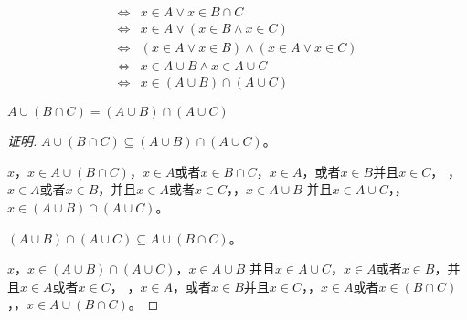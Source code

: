 \documentclass{beamer}
\begin{document}
\begin{CJK*}{UTF8}{gbsn}
\begin{frame}
\begin{equation*}
\begin{split}
      \Leftrightarrow& x \in A \lor x \in B \cap C\\
      \Leftrightarrow& x \in A \lor (x \in B \land x \in C)\\
      \Leftrightarrow& (x \in A \lor x \in B) \land (x \in A \lor x \in C)\\
      \Leftrightarrow& x \in A \cup B \land x \in A \cup C\\
      \Leftrightarrow& x \in (A \cup B) \cap (A \cup C)
    \end{split}
  \end{equation*}
\end{frame}
\begin{frame}
  $A \cup (B \cap C) = (A \cup B) \cap (A \cup C)$
  \begin{proof}[证明]
    $A \cup (B \cap C) \subseteq (A \cup B) \cap (A \cup C)$。
  
    $x$，$x \in A \cup (B \cap C)$， $x \in A$或者$x \in B \cap C$，$x \in A$，或者$x \in B$并且$ x \in C$，
    ，$x \in A$或者$x \in B$，并且$x \in A$或者$ x \in C$，，$x \in A \cup B$ 并且$x \in A \cup C$，，$x \in (A \cup B) \cap (A \cup C)$。
  
    $(A \cup B) \cap (A \cup C) \subseteq A \cup (B \cap C)$。
  
    $x$，$x \in (A \cup B) \cap (A \cup C)$， $x \in A \cup B$ 并且$x \in A \cup C$，$x \in A$或者$x \in B$，并且$x \in A$或者$ x \in C$，
    ，$x \in A$，或者$x \in B$并且$ x \in C$，，$x \in A$或者$x \in (B \cap C)$，，$x \in A \cup (B \cap C)$。
  
  \end{proof} 
\end{frame}


\end{CJK*}
\end{document}
